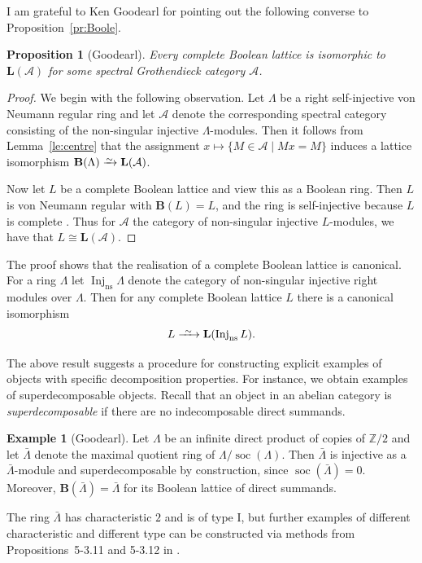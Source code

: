 \documentclass[a4paper]{amsart}
\theoremstyle{plain}
\newtheorem{prop}[thm]{Proposition}
\theoremstyle{definition}
\newtheorem{exm}[thm]{Example}
\theoremstyle{remark}
\numberwithin{equation}{section}
\newcommand{\Inj}{\operatorname{Inj}}
\newcommand{\soc}{\operatorname{soc}}
\newcommand{\iso}{\xrightarrow{\raisebox{-.4ex}[0ex][0ex]{$\scriptstyle{\sim}$}}}
\newcommand{\longiso}{\xrightarrow{\ \raisebox{-.4ex}[0ex][0ex]{$\scriptstyle{\sim}$}\ }}
\def\A{\mathcal A}
\def\bfB{\mathbf B}
\def\bfL{\mathbf L}
\def\bbZ{\mathbb Z}
\def\La{\Lambda}
\begin{document}
I am grateful to Ken Goodearl for pointing out the following converse
to Proposition~\ref{pr:Boole}.

\begin{prop}[Goodearl]
Every complete Boolean lattice is isomorphic to $\bfL(\A)$ for some
spectral Grothendieck category $\A$.
\end{prop}

\begin{proof}
  We begin with the following observation. Let $\La$ be a right
  self-injective von Neumann regular ring and let $\A$ denote the
  corresponding spectral category consisting of the non-singular
  injective $\La$-modules. Then it follows from
  Lemma~\ref{le:centre} that the assignment
  $x\mapsto\{M\in\A\mid Mx=M\}$ induces a lattice isomorphism
  $\bfB(\La)\iso\bfL(\A)$.

  Now let $L$ be a complete Boolean lattice and view this as a Boolean
  ring. Then $L$ is von Neumann regular with $\bfB(L)=L$, and the ring
  is self-injective because $L$ is complete
  \cite[Corollary~4]{BL1959}.  Thus for $\A$ the category of
  non-singular injective $L$-modules, we have that $L\cong \bfL(\A)$.
\end{proof}

The proof shows that the realisation of a complete Boolean lattice is
canonical.  For a ring $\La$ let $\Inj_{\mathrm{ns}}\La$ denote the
category of non-singular injective right modules over $\La$. Then for any complete
Boolean lattice $L$ there is a canonical isomorphism
\[L\longiso\bfL(\Inj_{\mathrm{ns}} L).\]

The above result suggests a procedure for constructing explicit
examples of objects with specific decomposition properties. For
instance, we obtain examples of superdecomposable objects. Recall that
an object in an abelian category is \emph{superdecomposable} if there
are no indecomposable direct summands.

\begin{exm}[Goodearl]\label{ex:superdecomp}
  Let $\La$ be an infinite direct product of copies of $\bbZ/2$ and
  let $\bar\La$ denote the maximal quotient ring of
  $\La/\soc(\La)$. Then $\bar\La$ is injective as a $\bar\La$-module and
  superdecomposable by construction, since $\soc(\bar\La)=0$.  Moreover,
  $\bfB(\bar\La)=\bar\La$ for its Boolean lattice of direct summands.

The ring $\bar\La$ has characteristic $2$ and is of type I, but
further examples of different characteristic and different type can be
constructed via methods from Propositions~5-3.11 and 5-3.12 in
\cite{GW2005}.
\end{exm}
\end{document}
